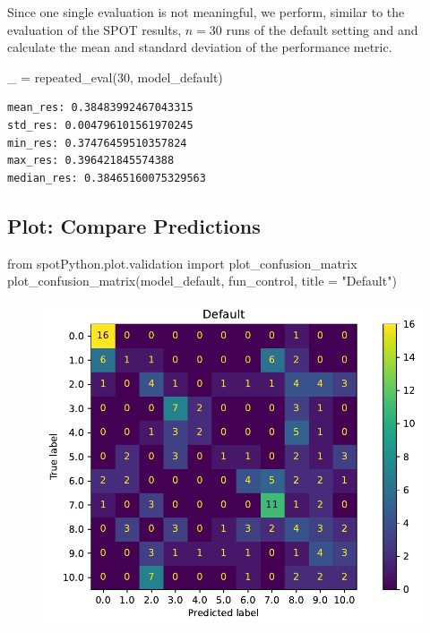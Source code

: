 \documentclass[
  letterpaper,
  DIV=11,
  numbers=noendperiod]{scrreprt}
\newenvironment{Shaded}{\begin{snugshade}}{\end{snugshade}}
\newcommand{\DecValTok}[1]{\textcolor[rgb]{0.68,0.00,0.00}{#1}}
\newcommand{\ImportTok}[1]{\textcolor[rgb]{0.00,0.46,0.62}{#1}}
\newcommand{\NormalTok}[1]{\textcolor[rgb]{0.00,0.23,0.31}{#1}}
\newcommand{\OperatorTok}[1]{\textcolor[rgb]{0.37,0.37,0.37}{#1}}
\newcommand{\StringTok}[1]{\textcolor[rgb]{0.13,0.47,0.30}{#1}}
\begin{document}
Since one single evaluation is not meaningful, we perform, similar to
the evaluation of the SPOT results, \(n=30\) runs of the default setting
and and calculate the mean and standard deviation of the performance
metric.

\begin{Shaded}
\begin{Highlighting}[]
\NormalTok{\_ }\OperatorTok{=}\NormalTok{ repeated\_eval(}\DecValTok{30}\NormalTok{, model\_default)}
\end{Highlighting}
\end{Shaded}

\begin{verbatim}
mean_res: 0.38483992467043315
std_res: 0.004796101561970245
min_res: 0.37476459510357824
max_res: 0.396421845574388
median_res: 0.38465160075329563
\end{verbatim}

\hypertarget{plot-compare-predictions-3}{%
\subsection{Plot: Compare
Predictions}\label{plot-compare-predictions-3}}

\begin{Shaded}
\begin{Highlighting}[]
\ImportTok{from}\NormalTok{ spotPython.plot.validation }\ImportTok{import}\NormalTok{ plot\_confusion\_matrix}
\NormalTok{plot\_confusion\_matrix(model\_default, fun\_control, title }\OperatorTok{=} \StringTok{"Default"}\NormalTok{)}
\end{Highlighting}
\end{Shaded}

\begin{figure}[H]

{\centering \includegraphics{18_spot_hpt_sklearn_multiclass_classification_svc_files/figure-pdf/cell-41-output-1.pdf}

}

\end{figure}
\end{document}
